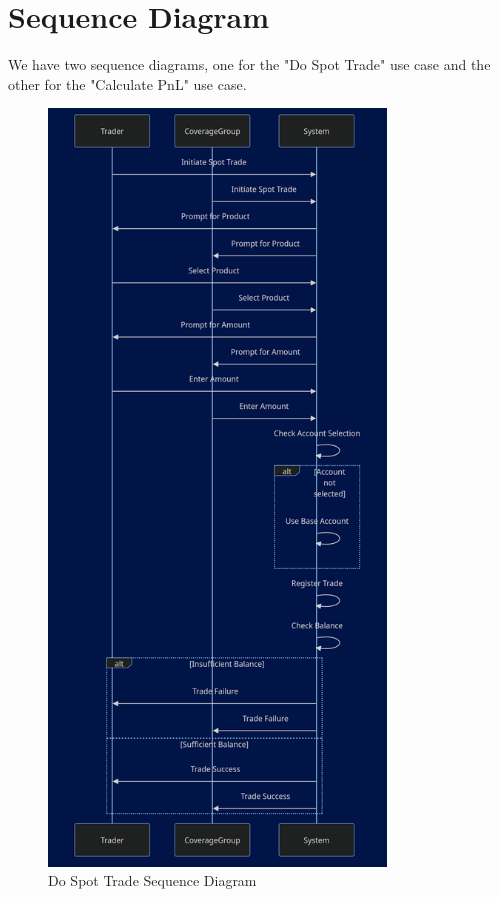 \documentclass[a4paper]{report}
\begin{document}
\chapter{Sequence Diagram}

We have two sequence diagrams, one for the "Do Spot Trade" use case and the other for the "Calculate PnL" use case.

\begin{figure}[h!]
    \centering
    \includegraphics[width=0.8\textwidth]{images/sequence1.png}
    \caption{Do Spot Trade Sequence Diagram}
    \label{fig:sequence1}
\end{figure}
\end{document}
